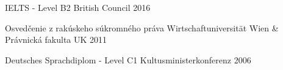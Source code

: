 

\begin{cvhonors}

  \cvhonor
    {IELTS - Level B2} %
    {British Council} %
    {} %
    {2016} %

  \cvhonor
    {Osvedčenie z rakúskeho súkromného práva} %
    {Wirtschaftuniversität Wien \& Právnická fakulta UK} %
    {} %
    {2011} %

  \cvhonor
    {Deutsches Sprachdiplom - Level C1} %
    {Kultusministerkonferenz} %
    {} %
    {2006} %

\end{cvhonors}
